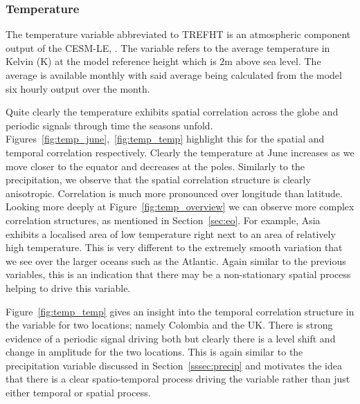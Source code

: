 \subsubsection{Temperature \label{sssec:temp}}
The temperature variable abbreviated to TREFHT is an atmospheric component output of the CESM-LE, \citep{kay_community_2015}.
The variable refers to the average temperature in Kelvin ($\si{\kelvin}$) at the model reference height which is $2\si{\meter}$ above sea level.
The average is available monthly with said average being calculated from the model six hourly output over the month.

Quite clearly the temperature exhibits spatial correlation across the globe and periodic signals through time the seasons unfold.
Figures~\ref{fig:temp_june},~\ref{fig:temp_temp} highlight this for the spatial and temporal correlation respectively.
Clearly the temperature at June increases as we move closer to the equator and decreases at the poles. 
Similarly to the precipitation, we observe that the spatial correlation structure is clearly anisotropic. 
Correlation is much more pronounced over longitude than latitude. 
Looking more deeply at Figure~\ref{fig:temp_overview} we can observe more complex correlation structures, as mentioned in Section~\ref{sec:eo}. 
For example, Asia exhibits a localised area of low temperature right next to an area of relatively high temperature. 
This is very different to the extremely smooth variation that we see over the larger oceans such as the Atlantic. 
Again similar to the previous variables, this is an indication that there may be a non-stationary spatial process helping to drive this variable.

Figure~\ref{fig:temp_temp} gives an insight into the temporal correlation structure in the variable for two locations; namely Colombia and the UK. 
There is strong evidence of a periodic signal driving both but clearly there is a level shift and change in amplitude for the two locations. 
This is again similar to the precipitation variable discussed in Section~\ref{sssec:precip} and motivates the idea that there is a clear spatio-temporal process driving the variable rather than just either temporal or spatial process.

